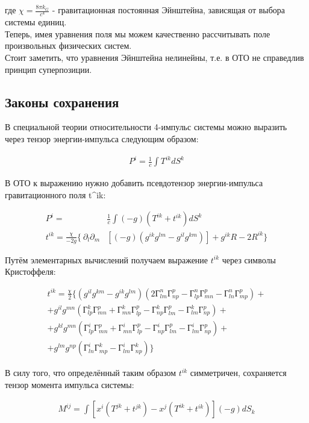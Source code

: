 \documentclass{article}
\begin{document}
		где $\chi = \frac{8 \pi k_G }{ c^4 }$ - гравитационная постоянная Эйнштейна, зависящая от выбора системы единиц. \\

		Теперь, имея уравнения поля мы можем качественно рассчитывать поле произвольных физических систем. \\

		Стоит заметить, что уравнения Эйнштейна нелинейны, т.е. в ОТО не справедлив принцип суперпозиции.

	\subsection{Законы сохранения}

		В специальной теории относительности 4-импульс системы можно выразить через тензор энергии-импульса следующим образом:

		\begin{align*}
			P^i = \frac{1}{c} \int T^{ik} dS^k
		\end{align*}

		В ОТО к выражению нужно добавить псевдотензор энергии-импульса гравитационного поля t^{ik}:

		\begin{align*}
			P^i = & \frac{1}{c} \int (-g)(T^{ik} + t^{ik}) dS^k \\
			t^{ik} = \frac{ \chi }{-2g} \{ \: \partial_l \partial_m & [(-g)(g^{ik} g^{lm} - g^{il} g^{km})] + g^{ik} R - 2R^{ik} \}
		\end{align*}

		Путём элементарных вычислений получаем выражение $t^{ik}$ через символы Кристоффеля:

		\begin{align*}
			t^{ik} = \frac{ \chi }{2} \{ ( g^{il} g^{km} - g^{ik} g^{lm} )( 2Г_{lm}^n Г_{np}^p - Г_{lp}^n Г_{mn}^p - Г_{ln}^n Г_{mp}^p ) + \\
			+ g^{il} g^{mn} ( Г_{lp}^k Г_{mn}^p + Г_{mn}^k Г_{lp}^p - Г_{np}^k Г_{lm}^p - Г_{lm}^k Г_{np}^p ) + \\
			+ g^{kl} g^{mn} ( Г_{lp}^i Г_{mn}^p + Г_{mn}^i Г_{lp}^p - Г_{np}^i Г_{lm}^p - Г_{lm}^i Г_{np}^p ) + \\
			+ g^{lm} g^{np} ( Г_{ln}^i Г_{mp}^k - Г_{lm}^i Г_{np}^k ) \}
		\end{align*}

		В силу того, что определённый таким образом $t^{ik}$ симметричен, сохраняется тензор момента импульса системы:

		\begin{align*}
			M^{ij} = \int [ x^i ( T^{jk} + t^{jk} ) - x^j ( T^{ik} + t^{ik} )](-g)dS_k
		\end{align*}
\end{document}
